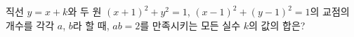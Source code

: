 직선 $y=x+k$와 두 원 $(x+1)^2+y^2=1$, $(x-1)^2+(y-1)^2=1$의 교점의 개수를 각각 $a$, $b$라 할 때, $ab=2$를 만족시키는 모든 실수 $k$의 값의 합은?
